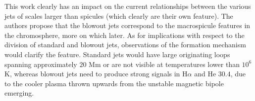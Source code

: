 This work clearly has an impact on the current relationships between the various jets of scales larger than spicules (which clearly are their own feature).
The authors propose that the blowout jets correspond to the macrospicule features in the chromosphere, more on which later.
As for implications with respect to the division of standard and blowout jets, observations of the formation mechanism would clarify the feature.
Standard jets would have large originating loops spanning approximately $20$ Mm or are not visible at temperatures lower than $10^6$ K, whereas blowout jets need to produce strong signals in H$\alpha$ and He $30.4$, due to the cooler plasma thrown upwards from the unstable magnetic bipole emerging.







